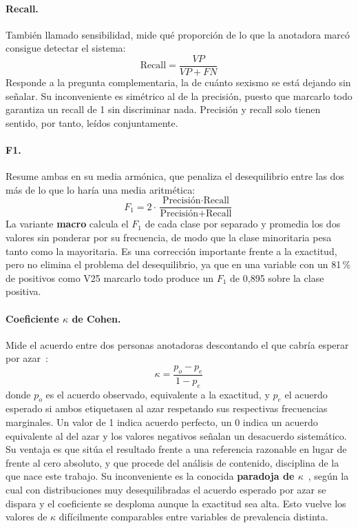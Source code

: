\paragraph{Recall.} También llamado sensibilidad, mide qué proporción de lo que la
anotadora marcó consigue detectar el sistema:
\begin{equation}
    \text{Recall} = \frac{VP}{VP + FN}
\end{equation}
Responde a la pregunta complementaria, la de cuánto sexismo se está dejando sin
señalar. Su inconveniente es simétrico al de la precisión, puesto que marcarlo
todo garantiza un recall de 1 sin discriminar nada. Precisión y recall solo tienen
sentido, por tanto, leídos conjuntamente.

\paragraph{F1.} Resume ambas en su media armónica, que penaliza el desequilibrio
entre las dos más de lo que lo haría una media aritmética:
\begin{equation}
    F_1 = 2 \cdot \frac{\text{Precisión} \cdot \text{Recall}}{\text{Precisión} + \text{Recall}}
\end{equation}
La variante \textbf{macro} calcula el $F_1$ de cada clase por separado y promedia
los dos valores sin ponderar por su frecuencia, de modo que la clase minoritaria
pesa tanto como la mayoritaria. Es una corrección importante frente a la
exactitud, pero no elimina el problema del desequilibrio, ya que en una variable
con un 81\,\% de positivos como V25 marcarlo todo produce un $F_1$ de 0,895 sobre
la clase positiva.

\paragraph{Coeficiente $\kappa$ de Cohen.} Mide el acuerdo entre dos personas anotadoras
descontando el que cabría esperar por azar~\cite{cohen1960}:
\begin{equation}
    \kappa = \frac{p_o - p_e}{1 - p_e}
\end{equation}
donde $p_o$ es el acuerdo observado, equivalente a la exactitud, y $p_e$ el
acuerdo esperado si ambos etiquetasen al azar respetando sus respectivas
frecuencias marginales. Un valor de 1 indica acuerdo perfecto, un 0 indica un
acuerdo equivalente al del azar y los valores negativos señalan un desacuerdo
sistemático. Su ventaja es que sitúa el resultado frente a una referencia
razonable en lugar de frente al cero absoluto, y que procede del análisis de
contenido, disciplina de la que nace este trabajo. Su inconveniente es la conocida
\textbf{paradoja de $\kappa$}~\cite{feinstein1990}, según la cual con
distribuciones muy desequilibradas el acuerdo esperado por azar se dispara y el
coeficiente se desploma aunque la exactitud sea alta. Esto vuelve los valores de
$\kappa$ difícilmente comparables entre variables de prevalencia distinta.

